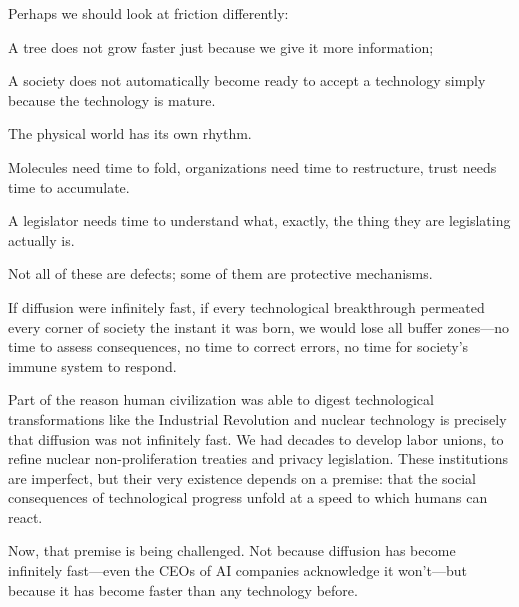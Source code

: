 \vspace{1em}

Perhaps we should look at friction differently:

A tree does not grow faster just because we give it more information;



A society does not automatically become ready to accept a technology simply because the technology is mature.

\vspace{1em}

The physical world has its own rhythm.

Molecules need time to fold, organizations need time to restructure, trust needs time to accumulate.

A legislator needs time to understand what, exactly, the thing they are legislating actually is.

Not all of these are defects; some of them are protective mechanisms.

\vspace{1em}

If diffusion were infinitely fast, if every technological breakthrough permeated every corner of society the instant it was born, we would lose all buffer zones---no time to assess consequences, no time to correct errors, no time for society's immune system to respond.

\vspace{1em}

Part of the reason human civilization was able to digest technological transformations like the Industrial Revolution and nuclear technology is precisely that diffusion was not infinitely fast. We had decades to develop labor unions, to refine nuclear non-proliferation treaties and privacy legislation.
These institutions are imperfect, but their very existence depends on a premise: that the social consequences of technological progress unfold at a speed to which humans can react.

\vspace{1em}

Now, that premise is being challenged.
Not because diffusion has become infinitely fast---even the CEOs of AI companies acknowledge it won't---but because it has become faster than any technology before.


